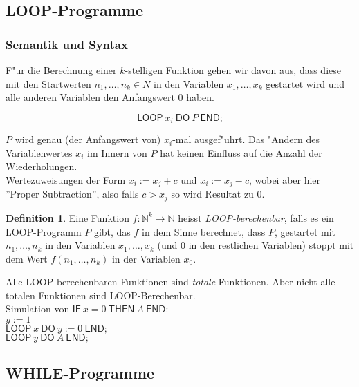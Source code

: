 \documentclass[german, 10pt, a4paper, twocolumn]{scrartcl}
\theoremstyle{definition}
\newtheorem*{definition}{Definition}
\theoremstyle{example}
\begin{document}
\subsection{LOOP-Programme}

\subsubsection{Semantik und Syntax}

F"ur die Berechnung einer $k$-stelligen Funktion gehen wir davon aus, dass diese mit den Startwerten $n_1, \ldots, n_k \in N$ in den Variablen $x_1, \ldots, x_k$ gestartet wird und alle anderen Variablen den Anfangswert 0 haben.

\begin{displaymath}
	\textsf{LOOP}\ x_i \ \textsf{DO} \ P \ \textsf{END;}
\end{displaymath}

$P$ wird genau (der Anfangswert von) $x_i$-mal ausgef"uhrt. Das "Andern des Variablenwertes $x_i$ im Innern von $P$ hat keinen Einfluss auf die Anzahl der Wiederholungen.\\

Wertezuweisungen der Form $x_i := x_j + c$ und $x_i := x_j -c$, wobei aber hier ''Proper Subtraction'', also falls $c > x_j$ so wird Resultat zu $0$.

\begin{definition}
	Eine Funktion $f: \mathbb{N}^k \to \mathbb{N}$ heisst \textit{LOOP-berechenbar}, falls es ein LOOP-Programm $P$ gibt, das $f$ in dem Sinne berechnet, dass $P$, gestartet mit $n_1,\ldots,n_k$ in den Variablen $x_1,\ldots,x_k$ (und 0 in den restlichen Variablen) stoppt mit dem Wert $f(n_1,\ldots,n_k)$ in der Variablen $x_0$.
\end{definition}

Alle LOOP-berechenbaren Funktionen sind \textit{totale} Funktionen. Aber nicht alle totalen Funktionen sind LOOP-Berechenbar.\\

Simulation von $\textsf{IF} \ x=0 \ \textsf{THEN} \ A \ \textsf{END}$:\\
$y := 1$\\
$\textsf{LOOP}\ x \ \textsf{DO} \ y := 0 \ \textsf{END;}$\\
$\textsf{LOOP}\ y \ \textsf{DO} \ A \ \textsf{END;}$

\subsection{WHILE-Programme}
\end{document}
